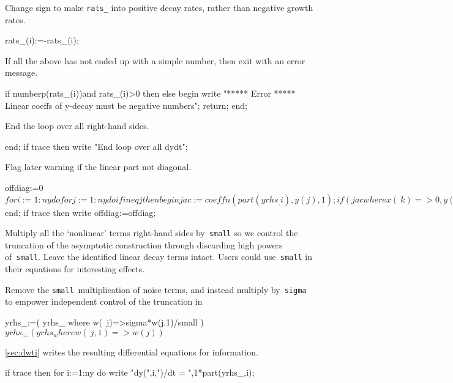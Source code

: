 \documentclass[11pt,a5paper]{article}
\begin{document}
Change sign to make \verb|rats_| into positive decay rates,
rather than negative growth rates.
\begin{reduce}
  rats_(i):=-rats_(i); 
\end{reduce}

If all the above has not ended up with a simple number, then
exit with an error message. 
\begin{reduce}
  if numberp(rats_(i))and rats_(i)>0 then
  else begin 
    write "***** Error *****
    Linear coeffs of y-decay must be negative numbers";
    return;
  end;
\end{reduce}

End the loop over all right-hand sides.
\begin{reduce}
end;
if trace then write "End loop over all dydt";
\end{reduce}

Flag later warning if the linear part not diagonal.
\begin{reduce}
offdiag:=0$
for i:=1:ny do for j:=1:ny do if i neq j then begin
  jac:=coeffn(part(yrhs_,i),y(j),1);
  if (jac where {x(~k)=>0,y(~k)=>0,z(~k)=>0,w(~k)=>0}) neq 0 
  then offdiag:=1$
end;
if trace then write offdiag:=offdiag;
\end{reduce}

Multiply all the `nonlinear' terms right-hand sides
by~\verb|small| so we control the truncation of the
asymptotic construction through discarding high powers
of~\verb|small|. Leave the identified linear decay terms
intact. Users could use~\verb|small| in their equations for
interesting effects. 

Remove the \verb|small|~multiplication of noise terms, and
instead multiply by~\verb|sigma| to empower independent
control of the truncation in 
\begin{reduce}
yrhs_:=( yrhs_ where w(~j)=>sigma*w(j,1)/small )$
yrhs_:=( yrhs_ where w(~j,1)=>w(j) )$
\end{reduce}

\cref{sec:dwti} writes the resulting differential equations
for information.
\begin{reduce}
if trace then for i:=1:ny do 
    write "dy(",i,")/dt = ",1*part(yrhs_,i);
\end{reduce}
\end{document}
